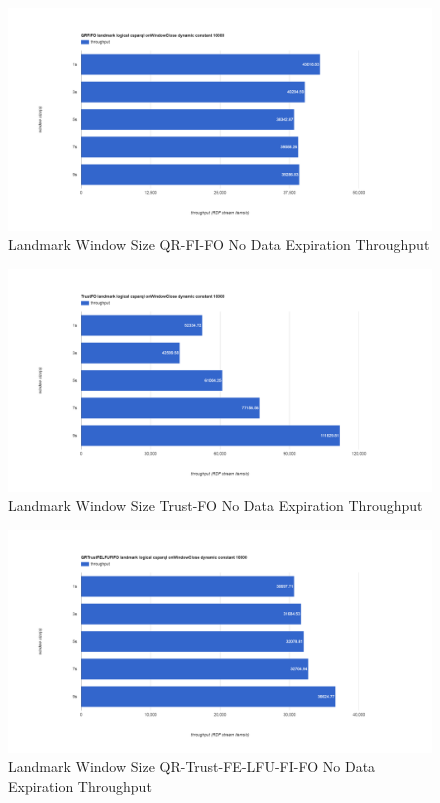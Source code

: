 \begin{figure}[!htbp]
    \centering
    \includegraphics[width=\textwidth]{img/app3-land-ws-qrfifo-no-t.png}
    \caption{Landmark Window Size QR-FI-FO No Data Expiration Throughput}
\end{figure}
\begin{figure}[!htbp]
    \centering
    \includegraphics[width=\textwidth]{img/app3-land-ws-trustfo-no-t.png}
    \caption{Landmark Window Size Trust-FO No Data Expiration Throughput}
\end{figure}
\begin{figure}[!htbp]
    \centering
    \includegraphics[width=\textwidth]{img/app3-land-ws-qrtrustfelfufifo-no-t.png}
    \caption{Landmark Window Size QR-Trust-FE-LFU-FI-FO No Data Expiration Throughput}
\end{figure}